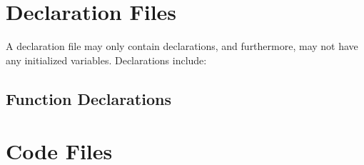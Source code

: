 \documentclass[letterpaper,12pt]{book}
\begin{document}
\section{Declaration Files}

A declaration file may only contain declarations, and furthermore, may not have any initialized variables. Declarations include:

\subsection{Function Declarations}

\section{Code Files}
\end{document}
